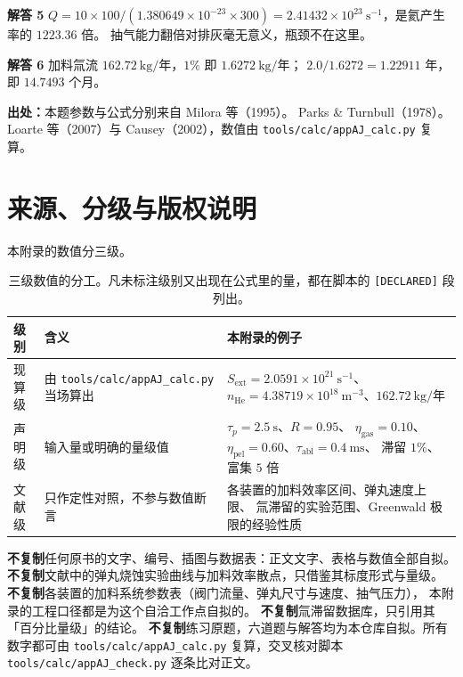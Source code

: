 \textbf{解答 5} $Q = 10\times100/(1.380649\times10^{-23}\times300)
= 2.41432\times10^{23}\ \mathrm{s^{-1}}$，是氦产生率的 $1223.36$ 倍。
抽气能力翻倍对排灰毫无意义，瓶颈不在这里。

\textbf{解答 6} 加料氚流 $162.72\ \text{kg/年}$，$1\%$ 即 $1.6272\ \text{kg/年}$；
$2.0/1.6272 = 1.22911$ 年，即 $14.7493$ 个月。

\textbf{出处：}本题参数与公式分别来自 Milora 等（1995）。
Parks \& Turnbull（1978）。
Loarte 等（2007）与 Causey（2002），数值由 \texttt{tools/\allowbreak{}calc/\allowbreak{}appAJ\_calc.py} 复算。

\section{来源、分级与版权说明}
\label{sec:app-aj-source}

\begingroup\small
本附录的数值分三级。

\begin{table}[htbp]
\centering
\small
\caption{三级数值的分工。凡未标注级别又出现在公式里的量，都在脚本的 \texttt{[DECLARED]} 段列出。}
\label{tab:app-aj-source}
\begin{tabular}{p{2.2cm}p{4.6cm}p{7.0cm}}
\toprule
级别 & 含义 & 本附录的例子 \\
\midrule
现算级 & 由 \texttt{tools/\allowbreak{}calc/\allowbreak{}appAJ\_calc.py} 当场算出 & $S_{\mathrm{ext}} = 2.0591\times10^{21}\ \mathrm{s^{-1}}$、
$n_{\mathrm{He}} = 4.38719\times10^{18}\ \mathrm{m^{-3}}$、$162.72\ \text{kg/年}$ \\
声明级 & 输入量或明确的量级值 & $\tau_p = 2.5\ \mathrm{s}$、$R = 0.95$、
$\eta_{\mathrm{gas}} = 0.10$、$\eta_{\mathrm{pel}} = 0.60$、$\tau_{\mathrm{abl}} = 0.4\ \mathrm{ms}$、
滞留 $1\%$、富集 $5$ 倍 \\
文献级 & 只作定性对照，不参与数值断言 & 各装置的加料效率区间、弹丸速度上限、
氚滞留的实验范围、Greenwald 极限的经验性质 \\
\bottomrule
\end{tabular}

\end{table}

\textbf{不复制}任何原书的文字、编号、插图与数据表：正文文字、表格与数值全部自拟。
\textbf{不复制}文献中的弹丸烧蚀实验曲线与加料效率散点，只借鉴其标度形式与量级。
\textbf{不复制}各装置的加料系统参数表（阀门流量、弹丸尺寸与速度、抽气压力），
本附录的工程口径都是为这个自洽工作点自拟的。
\textbf{不复制}氚滞留数据库，只引用其「百分比量级」的结论。
\textbf{不复制}练习原题，六道题与解答均为本仓库自拟。所有数字都可由
\texttt{tools/\allowbreak{}calc/\allowbreak{}appAJ\_calc.py} 复算，交叉核对脚本 \texttt{tools/\allowbreak{}calc/\allowbreak{}appAJ\_check.py} 逐条比对正文。

